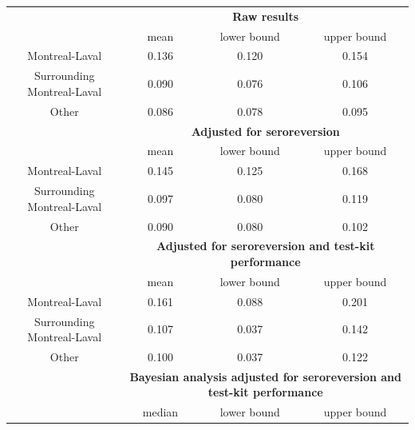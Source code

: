 \begin{table}[]
\centering
\begin{tabular}{c|ccc}
                           & \multicolumn{3}{c}{\textbf{Raw results}}                                        \\
                           & mean                & lower bound             & upper bound             \\
Montreal-Laval             & 0.136               & 0.120                  & 0.154                  \\
Surrounding Montreal-Laval & 0.090               & 0.076                  & 0.106                  \\
Other                      & 0.086               & 0.078                  & 0.095                  \\
\hline
                           & \multicolumn{3}{c}{\textbf{Adjusted for seroreversion}}                          \\
                           & mean                & lower bound             & upper bound             \\
Montreal-Laval             & 0.145               & 0.125                  & 0.168                  \\
Surrounding Montreal-Laval & 0.097               & 0.080                  & 0.119                  \\
Other                      & 0.090               & 0.080                  & 0.102                  \\
\hline
                           & \multicolumn{3}{c}{\textbf{Adjusted for seroreversion and test-kit performance}} \\
                           & mean                & lower bound             & upper bound             \\
Montreal-Laval             & 0.161               & 0.088                  & 0.201                  \\
Surrounding Montreal-Laval & 0.107               & 0.037                  & 0.142                  \\
Other                      & 0.100               & 0.037             & 0.122                  \\
\hline
                           & \multicolumn{3}{c}{\textbf{Bayesian analysis adjusted for seroreversion and test-kit performance}}                                 \\
                           & median              & lower bound             & upper bound             \\

\end{tabular}
\end{table}
